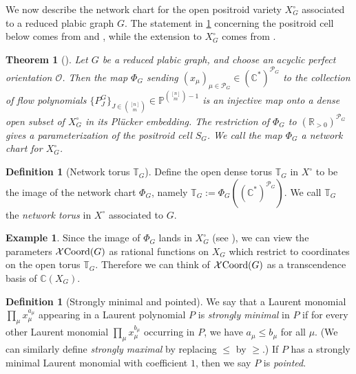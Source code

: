 \documentclass{amsart}
\newtheorem{theorem}[thm]{Theorem}
\theoremstyle{definition}
\newtheorem{example}[thm]{Example}
\newtheorem{definition}[thm]{Definition}
\numberwithin{equation}{section}
\newcommand{\R}{\mathbb R}
\def\O{\mathcal{O}}
\newcommand{\C}{\mathbb{C}}
\newcommand{\TBG}{{\mathcal X\hskip -.05cm\operatorname{Coord}(G)}}
\newcommand{\openX}{{X}^\circ}
\begin{document}
We now describe the network chart for 
the open positroid variety 
$X^{\circ}_G$ associated to a reduced
plabic graph $G$.
The statement in \cref{thm:Talaska} concerning the positroid cell
below comes from \cite{Talaska} and \cite[Theorem 12.7]{Postnikov}, while the extension to 
$X^{\circ}_G$ 
 comes from 
 \cite{MullerSpeyer}.

\begin{theorem}[{\cite[Theorem 12.7]{Postnikov}}]\label{thm:Talaska}
Let $G$ be a reduced plabic graph, and choose
an acyclic perfect orientation $\O$. 
Then the map $\Phi_G$ sending 
$(x_{\mu})_{\mu \in \mathcal{P}_G}
\in (\C^*)^{\mathcal{P}_G}$ to the 
collection of flow polynomials 
$\{P_J^G\}_{J\in {[n]\choose m}} \in \mathbb{P}^{{[n] \choose m}-1}$
is an injective map onto a dense open subset of $X_G^{\circ}$ in its
Pl\"ucker embedding.
The restriction of $\Phi_G$ to 
$(\R_{>0})^{\mathcal{P}_G}$ 
gives a parameterization of the positroid cell $S_G$.
	We call the map $\Phi_G$ a \emph{network chart} for $X_{G}^{\circ}$.
\end{theorem}



\begin{definition}[Network torus $\mathbb T_G$]  \label{d:networktorus2}
Define the open dense torus $\mathbb T_G $ in $\openX$ to be the image  of the network chart $\Phi_G$, namely
$\mathbb T_G
:=\Phi_G((\C^*)^{\mathcal{P}_G})$.
%
We call $\mathbb T_G$ the {\it network torus} in $\openX$ associated to $G$. 
\end{definition}



\begin{example}\label{Ex:Transc}
Since the image of $\Phi_G$ lands in 
$X_G^{\circ}$ (see \cite[Section 1.1]{MullerSpeyer}), %
we can view the parameters $\TBG$ as rational functions on $X_G$ which restrict to coordinates on the open torus $\mathbb T_G$. Therefore we can think of $\TBG$ as a transcendence basis of $\C(X_G)$.
\end{example}



\begin{definition}[Strongly minimal 
 and pointed]\label{def:minimal}
We say that a Laurent monomial 
$\prod_\mu x_\mu^{a_\mu}$ appearing
in a Laurent polynomial $P$ is \emph{strongly minimal}
 in $P$  if 
for every other Laurent monomial $\prod_\mu x_\mu^{b_\mu}$ occurring in $P$,
we have $a_\mu\le b_{\mu}$ for all $\mu$.  
(We can similarly define \emph{strongly maximal} by replacing $\le$
by $\geq$.)
If $P$ has a strongly minimal Laurent
monomial with coefficient $1$, then we say  $P$ is \emph{pointed}.
\end{definition}
\end{document}
